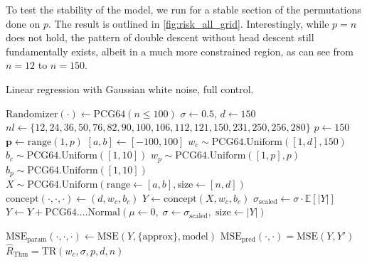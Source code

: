 \documentclass{article}
\begin{document}
To test the stability of the model, we run for a stable section of the permutations done on $p$. The result is outlined in \ref{fig:risk_all_grid}. Interestingly, while $p=n$ does not hold, the pattern of double descent without head descent still fundamentally exists, albeit in a much more constrained region, as can see from $n=12$ to $n=150$. 

\begin{algorithm}
    \caption{Linear regression with Gaussian white noise, full control.}
    \Begin
    {
    $\mathrm{Randomizer}(\cdot)\gets\mathrm{PCG64}(n\leq 100)$
    $\sigma\gets 0.5$, $d\gets 150$
    $nl\gets\{12,24,36,50,76,82,90,100,106,112,121,150,231,250,256,280\}$
    $p\gets 150$
    $\mathbf{p}\gets \mathrm{range}(1,p)$\; $[a,b]\gets [-100,100]$\;
    $w_{c}\sim \mathrm{PCG64}.\mathrm{Uniform}([1,d],150)$\; $b_{c}\sim \mathrm{PCG64}.\mathrm{Uniform}([1,10])$\;
    $w_{p}\sim \mathrm{PCG64}.\mathrm{Uniform}([1,p],p)$\; $b_{p}\sim \mathrm{PCG64}.\mathrm{Uniform}([1,10])$\;
    $X\sim\mathrm{PCG64}.\mathrm{Uniform}(\mathrm{range}\gets[a,b],\mathrm{size}\gets[n,d])$
    $\mathrm{concept}(\cdot,\cdot,\cdot)\gets (d,w_{c},b_{c})$\;
    $Y \gets \mathrm{concept}(X, w_{c},b_{c})$\;
    $\sigma_{\mathrm{scaled}} \gets \sigma \cdot \mathbb{E}\left[\lvert Y\rvert\right]$\;
    $Y \gets Y + \mathrm{PCG64}.…\mathrm{Normal}\left(\mu\gets 0,\;\sigma\gets \sigma_{\mathrm{scaled}},\;\mathrm{size}\gets\lvert Y\rvert\right)$ 

    $\mathrm{MSE}_{\mathrm{param}}(\cdot,\cdot,\cdot)\gets \mathrm{MSE}(Y,\{\mathrm{approx}\},\mathrm{model})$\;
    $\mathrm{MSE}_{\mathrm{pred}}(\cdot,\cdot)=\mathrm{MSE}(Y,Y')$
    $\hat{R}_{\mathrm{Thm}}=\mathrm{TR}(w_{c},\sigma,p,d,n)$\;
    }
    \label{algo:algo_reg_lin_1}
\end{algorithm}
\end{document}
